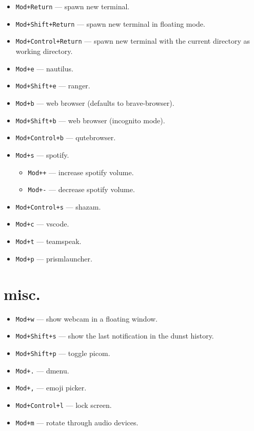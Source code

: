 \documentclass{article}
\begin{document}
\vspace*{-.5\baselineskip}
\begin{itemize}
	\item \texttt{Mod+Return} --- spawn new terminal.
	\item \texttt{Mod+Shift+Return} --- spawn new terminal in floating mode.
	\item \texttt{Mod+Control+Return} --- spawn new terminal with the current directory as working directory.
	\item \texttt{Mod+e} --- nautilus.
	\item \texttt{Mod+Shift+e} --- ranger.
	\item \texttt{Mod+b} --- web browser (defaults to brave-browser).
	\item \texttt{Mod+Shift+b} --- web browser (incognito mode).
	\item \texttt{Mod+Control+b} --- qutebrowser.
	\item \texttt{Mod+s} --- spotify.

		\vspace*{-\baselineskip}
		\begin{itemize}
			\item \texttt{Mod{\small+}+} --- increase spotify volume.
			\item \texttt{Mod{\small+}-} --- decrease spotify volume.
		\end{itemize}\vspace*{-.5\baselineskip}
	\item \texttt{Mod+Control+s} --- shazam.
	\item \texttt{Mod+c} --- vscode.
	\item \texttt{Mod+t} --- teamspeak.
	\item \texttt{Mod+p} --- prismlauncher.
\end{itemize}

\section*{misc.}

\vspace*{-.5\baselineskip}
\begin{itemize}
	\item \texttt{Mod+w} --- show webcam in a floating window.
	\item \texttt{Mod+Shift+s} --- show the last notification in the dunst history.
	\item \texttt{Mod+Shift+p} --- toggle picom.
	\item \texttt{Mod+.} --- dmenu.
	\item \texttt{Mod+,} --- emoji picker.
	\item \texttt{Mod+Control+l} --- lock screen.
	\item \texttt{Mod+m} --- rotate through audio devices.
\end{itemize}
\end{document}
